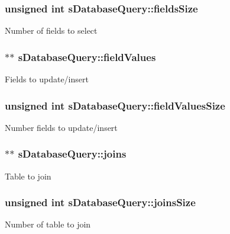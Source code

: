 \subsubsection[{\texorpdfstring{fields\+Size}{fieldsSize}}]{\setlength{\rightskip}{0pt plus 5cm}unsigned int s\+Database\+Query\+::fields\+Size}\hypertarget{structsDatabaseQuery_a052737bce106f2758ba5d5ac663ff57a}{}\label{structsDatabaseQuery_a052737bce106f2758ba5d5ac663ff57a}
Number of fields to select 
\subsubsection[{\texorpdfstring{field\+Values}{fieldValues}}]{$\ast$$\ast$ s\+Database\+Query\+::field\+Values}\hypertarget{structsDatabaseQuery_a7bf7cf5cda36b6c6d3701926c35d8972}{}\label{structsDatabaseQuery_a7bf7cf5cda36b6c6d3701926c35d8972}
Fields to update/insert 
\subsubsection[{\texorpdfstring{field\+Values\+Size}{fieldValuesSize}}]{\setlength{\rightskip}{0pt plus 5cm}unsigned int s\+Database\+Query\+::field\+Values\+Size}\hypertarget{structsDatabaseQuery_aa203f0cb4e33b39d48e6674250d9f74d}{}\label{structsDatabaseQuery_aa203f0cb4e33b39d48e6674250d9f74d}
Number fields to update/insert 
\subsubsection[{\texorpdfstring{joins}{joins}}]{$\ast$$\ast$ s\+Database\+Query\+::joins}\hypertarget{structsDatabaseQuery_aa66192f20c6390fd1bd5f2db96860926}{}\label{structsDatabaseQuery_aa66192f20c6390fd1bd5f2db96860926}
Table to join 
\subsubsection[{\texorpdfstring{joins\+Size}{joinsSize}}]{\setlength{\rightskip}{0pt plus 5cm}unsigned int s\+Database\+Query\+::joins\+Size}\hypertarget{structsDatabaseQuery_aca409db9b76aea5d1e83390e2a251fd3}{}\label{structsDatabaseQuery_aca409db9b76aea5d1e83390e2a251fd3}
Number of table to join 
